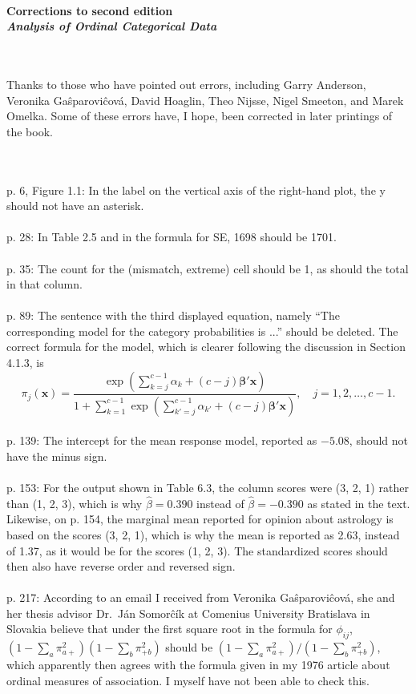 \documentclass[12pt]{article}
\begin{document}
\ \\
{\bf \large Corrections to second edition  \\ [.1in]
  {\em Analysis of Ordinal Categorical Data} }

\ \\ \ \\ Thanks to those who have pointed out errors, including Garry
Anderson, Veronika Ga\^sparovi\^cov\'a, David Hoaglin, Theo Nijsse,
Nigel Smeeton, and Marek Omelka.  Some of these errors have, I hope,
been corrected in later printings of the book.

\ \\
\ \\
p. 6, Figure 1.1: In the label on the vertical axis of the 
right-hand plot, the y should not have an asterisk. \\
\ \\
p. 28: In Table 2.5 and in the formula for SE, 1698 should be 1701. \\
\ \\
p. 35: The count for the (mismatch, extreme) cell should be 1, as
should the total in that column. \\
\ \\
p. 89: The sentence with the third displayed equation, namely ``The
corresponding model for the category probabilities is ...'' should
be deleted.  The correct formula for the model, which is clearer 
following the discussion in Section 4.1.3, is
%
\[
\pi_j(\mathbf{x}) = \frac{\exp(\sum_{k=j}^{c-1} \alpha_k 
+ (c-j)\bm{\beta}'\mathbf{x})}
{1 + \sum_{k=1}^{c-1} \exp(\sum_{k'=j}^{c-1}\alpha_{k'} 
+ (c-j)\bm{\beta}'\mathbf{x})}, \quad
j = 1, 2, \ldots , c-1.
\]
%
\ \\
p. 139: The intercept for the mean response model, reported as
$-5.08$, should not have the minus sign. \\
\ \\
p. 153: For the output shown in Table 6.3, the column scores
were (3, 2, 1) rather than (1, 2, 3), which is why $\hat\beta
= 0.390$ instead of $\hat\beta = - 0.390$ as stated in the text.
Likewise, on p. 154, the marginal mean reported for opinion
about astrology is based on the scores (3, 2, 1), which is why
the mean is reported as 2.63, instead of 1.37, as it would be for
the scores (1, 2, 3).  The standardized scores should then
also have reverse order and reversed sign. \\
\ \\
p. 217: According to an email I received from Veronika Ga\^sparovi\^cov\'a,
she and her thesis advisor Dr.\ J\'an Somor\^cík at Comenius University Bratislava in Slovakia believe that under the first square root in the formula for $\phi_{ij}$, $(1 - \sum_a \pi_{a+}^2)(1 - \sum_b \pi_{+b}^2)$ should be $(1 - \sum_a \pi_{a+}^2)/(1 - \sum_b \pi_{+b}^2)$, which apparently then agrees with the formula given in my 1976 article about ordinal measures of association.  I myself have not been able to check this.\\
\end{document}
